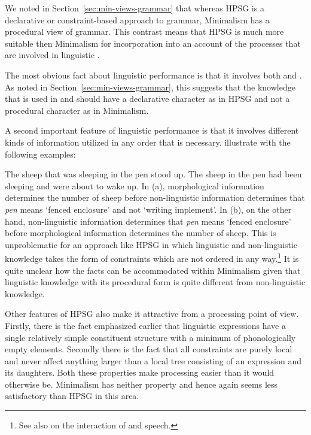 \documentclass[output=paper]{langsci/langscibook}
\begin{document}
We noted in Section~\ref{sec:min-views-grammar} that whereas HPSG is a declarative or constraint-based approach to grammar,
Minimalism has a procedural view of grammar. This contrast means that HPSG is much more suitable
then Minimalism for incorporation into an account of the processes that are involved in linguistic
.

The most obvious fact about linguistic performance is that it involves both  and
. As noted in Section~\ref{sec:min-views-grammar}, this suggests that the knowledge
that is used in  and  should have a declarative character as in HPSG and not
a procedural character as in Minimalism.  

A second important feature of linguistic performance is that it involves different kinds of
information utilized in any order that is necessary. \citet[--368]{SW2011a} illustrate with the
following examples: 

\eal
\label{ex-sheep-pen-processing}
\ex The sheep that was sleeping in the pen stood up.
\ex The sheep in the pen had been sleeping and were about to wake up.
\zl
In (a), morphological information determines the number of sheep before non-linguistic
information determines that \emph{pen} means ‘fenced enclosure’ and not ‘writing implement’. In (b),
on the other hand, non-linguistic information determines that \emph{pen} means ‘fenced enclosure’ before
morphological information determines the number of sheep. This is unproblematic for an approach like
HPSG in which linguistic and non-linguistic knowledge takes the form of constraints which are not
ordered in any way.\footnote{
  See also  on the interaction of  and speech.%
} It is quite unclear how the facts can be accommodated within Minimalism given
that linguistic knowledge with its procedural form is quite different from non-linguistic
knowledge. 

Other features of HPSG also make it attractive from a processing point of view. Firstly, there is
the fact emphasized earlier that linguistic expressions have a single relatively simple constituent
structure with a minimum of phonologically empty elements. Secondly there is the fact that all
constraints are purely local and never affect anything larger than a local tree consisting of an
expression and its daughters. Both these properties make processing easier than it would otherwise
be. Minimalism has neither property and hence again seems less satisfactory than HPSG in this area. 
\end{document}
